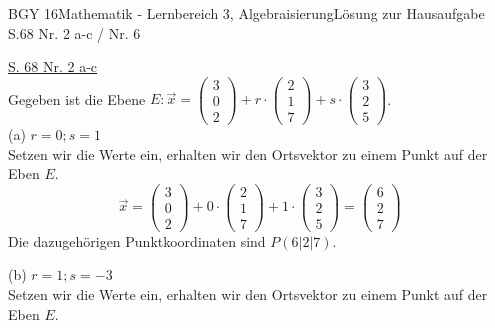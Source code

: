 \documentclass[oneside,openany,headings=optiontotoc,11pt,numbers=noenddot]{scrreprt}
\begin{document}
	\begin{worksheet}{BGY 16}{Mathematik - Lernbereich 3, Algebraisierung}{Lösung zur Hausaufgabe S.68 Nr. 2 a-c / Nr. 6}
				
		\begin{framed}
			\noindent
			\tiny{\color{codegray}\underline{S. 68 Nr. 2 a-c}}\\
			Gegeben ist die Ebene \(E: \vec{x} = \left(\begin{matrix}3\\0\\2\end{matrix}\right) + r\cdot\left(\begin{matrix}2\\1\\7\end{matrix}\right) + s\cdot\left(\begin{matrix}3\\2\\5\end{matrix}\right)\).\\
			(a) \(r = 0; s=1\)\\
			Setzen wir die Werte ein, erhalten wir den Ortsvektor zu einem Punkt auf der Eben \(E\).\\
			\[\vec{x} = \left(\begin{matrix}3\\0\\2\end{matrix}\right) + 0\cdot\left(\begin{matrix}2\\1\\7\end{matrix}\right) + 1\cdot\left(\begin{matrix}3\\2\\5\end{matrix}\right) = \left(\begin{matrix}6\\2\\7\end{matrix}\right)\]
			Die dazugehörigen Punktkoordinaten sind \colorbox{green!10}{\underline{\(P(6|2|7)\)}}.\\
			\par\bigskip\noindent
			(b) \(r = 1; s=-3\)\\
			Setzen wir die Werte ein, erhalten wir den Ortsvektor zu einem Punkt auf der Eben \(E\).\\

\end{framed}
\end{worksheet}
\end{document}
